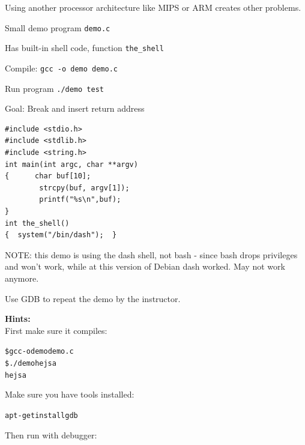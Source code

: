 \documentclass[a4paper,11pt,notitlepage]{report}
\begin{document}
Using another processor architecture like MIPS or ARM creates other problems.

\begin{list2}
\item Small demo program \verb+demo.c+
\item Has built-in shell code, function \verb+the_shell+
\item Compile:
\verb+gcc -o demo demo.c+
\item Run program
\verb+./demo test+
\item Goal: Break and insert return address
\end{list2}

\begin{verbatim}
#include <stdio.h>
#include <stdlib.h>
#include <string.h>
int main(int argc, char **argv)
{      char buf[10];
        strcpy(buf, argv[1]);
        printf("%s\n",buf);
}
int the_shell()
{  system("/bin/dash");  }
\end{verbatim}

NOTE: this demo is using the dash shell, not bash - since bash drops privileges and won't work, while at this version of Debian dash worked. May not work anymore.

Use GDB to repeat the demo by the instructor.

{\bf Hints:}\\
First make sure it compiles:
\begin{alltt}
\$ gcc -o demo demo.c
\$ ./demo hejsa
hejsa
\end{alltt}

Make sure you have tools installed:
\begin{alltt}
apt-get install gdb
\end{alltt}

Then run with debugger:
\end{document}
